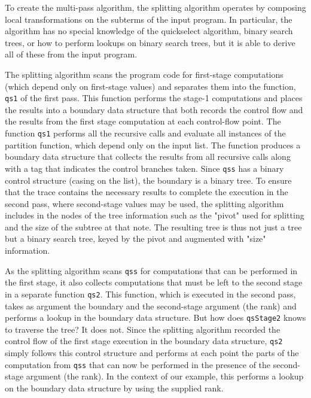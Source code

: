 \begin{abstrsyn}
To create the multi-pass algorithm, the splitting algorithm operates
by composing local transformations on the subterms of the input
program.  In particular, the algorithm has no special knowledge of the
quickselect algorithm, binary search trees, or how to perform lookups
on binary search trees, but it is able to derive all of these from the
input program.
%

The splitting algorithm scans the program code for first-stage
computations (which depend only on first-stage values) and separates
them into the function, \texttt{qs1} of the first pass. This function
performs the stage-1 computations and places the results into a
boundary data structure that both records the control flow and the
results from the first stage computation at each control-flow point.
The function \texttt{qs1} performs all the recursive calls and
evaluate all instances of the partition function, which depend only on
the input list.  The function produces a boundary data structure that
collects the results from all recursive calls along with a tag that
indicates the control branches taken.  Since \texttt{qss} has a binary
control structure (casing on the list), the boundary is a binary tree.
To ensure that the trace contains the necessary results to complete
the execution in the second pass, where second-stage values may be
used, the splitting algorithm includes in the nodes of the tree
information such as the "pivot" used for splitting and the size of the
subtree at that note.  The resulting tree is thus not just a tree but
a binary search tree, keyed by the pivot and augmented with "size"
information.

As the splitting algorithm scans \texttt{qss} for computations that
can be performed in the first stage, it also collects computations
that must be left to the second stage in a separate function
\texttt{qs2}.  This function, which is executed in the second pass,
takes as argument the boundary and the second-stage argument (the
rank) and performs a lookup in the boundary data structure.  But how
does \texttt{qsStage2} knows to traverse the tree? It does not. Since
the splitting algorithm recorded the control flow of the first stage
execution in the boundary data structure, \texttt{qs2} simply follows
this control structure and performs at each point the parts of the
computation from \texttt{qss} that can now be performed in the
presence of the second-stage argument (the rank).  In the context of
our example, this performs a lookup on the boundary data structure by
using the supplied rank.


\end{abstrsyn}
